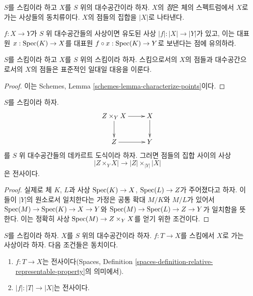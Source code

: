 \begin{definition}
\label{definition-points}
$S$를 스킴이라 하고 $X$를 $S$ 위의 대수공간이라 하자.
$X$의 {\it 점}은 체의 스펙트럼에서 $X$로 가는 사상들의
동치류이다. $X$의 점들의 집합을 $|X|$로 나타낸다.
\end{definition}

\noindent
$f : X \to Y$가 $S$ 위 대수공간들의 사상이면 유도된 사상
$|f| : |X| \to |Y|$가 있고, 이는 대표원
$x : \mathop{\mathrm{Spec}}(K) \to X$를 대표원
$f \circ x : \mathop{\mathrm{Spec}}(K) \to Y$로 보낸다는 점에 유의하라.

\begin{lemma}
\label{lemma-scheme-points}
$S$를 스킴이라 하고 $X$를 $S$ 위의 스킴이라 하자.
스킴으로서의 $X$의 점들과 대수공간으로서의 $X$의 점들은
표준적인 일대일 대응을 이룬다.
\end{lemma}

\begin{proof}
이는 Schemes, Lemma \ref{schemes-lemma-characterize-points}이다.
\end{proof}

\begin{lemma}
\label{lemma-points-cartesian}
$S$를 스킴이라 하자.
$$
\xymatrix{
Z \times_Y X \ar[r] \ar[d] & X \ar[d] \\
Z \ar[r] & Y
}
$$
를 $S$ 위 대수공간들의 데카르트 도식이라 하자.
그러면 점들의 집합 사이의 사상
$$
|Z \times_Y X|
\longrightarrow
|Z| \times_{|Y|} |X|
$$
은 전사이다.
\end{lemma}

\begin{proof}
실제로 체 $K$, $L$과 사상
$\mathop{\mathrm{Spec}}(K) \to X$, $\mathop{\mathrm{Spec}}(L) \to Z$가 주어졌다고 하자.
이들이 $|Y|$의 원소로서 일치한다는 가정은 공통 확대
$M/K$와 $M/L$가 있어서
$\mathop{\mathrm{Spec}}(M) \to \mathop{\mathrm{Spec}}(K) \to X \to Y$와
$\mathop{\mathrm{Spec}}(M) \to \mathop{\mathrm{Spec}}(L) \to Z \to Y$가 일치함을 뜻한다.
이는 정확히 사상 $\mathop{\mathrm{Spec}}(M) \to Z \times_Y X$를
얻기 위한 조건이다.
\end{proof}

\begin{lemma}
\label{lemma-characterize-surjective}
$S$를 스킴이라 하자.
$X$를 $S$ 위의 대수공간이라 하자.
$f : T \to X$를 스킴에서 $X$로 가는 사상이라 하자.
다음 조건들은 동치이다.
\begin{enumerate}
\item $f : T \to X$는 전사이다(Spaces, Definition
\ref{spaces-definition-relative-representable-property}의 의미에서).
\item $|f| : |T| \to |X|$는 전사이다.
\end{enumerate}
\end{lemma}

